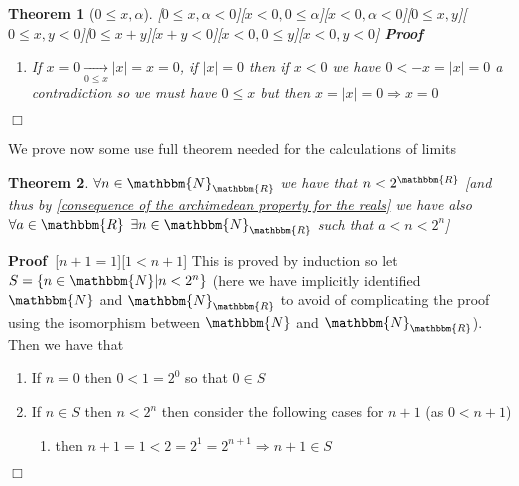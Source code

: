 \documentclass{book}
\newcommand{\Rightarrowlim}{\mathop{\rightarrow}\limits}
\newcommand{\equallim}{\mathop{=}\limits}
\newenvironment{proof}{\noindent\textbf{Proof\ }}{\hspace*{\fill}$\Box$\medskip}
\newtheorem{theorem}{Theorem}
\begin{document}
{{\begin{theorem}[$0 \leqslant x, \alpha$][$0 \leqslant x, \alpha < 0$][$x < 0,
0 \leqslant \alpha$][$x < 0, \alpha < 0$][$0 \leqslant x, y$][$0 \leqslant x,
y < 0$][$0 \leqslant x + y$][$x + y < 0$][$x < 0, 0 \leqslant y$][$x < 0, y <
0$]
\begin{proof}
\begin{enumerate}
\begin{enumerate}
\begin{enumerate}
          \item then $| x + y | = - x - y \Rightarrowlim_{0 \leqslant x
          \Rightarrow - x \leqslant 0 \leqslant x} - x - y \leqslant x - y
          \equallim_{- y = | y |} x + | y | = | x | + | y | \Rightarrow | x +
          y | \leqslant | x | + | y |$
        \end{enumerate}
        \item then if we take $x' = y$ and $y' = x$ we have $| x + y | = | y +
        x | = | x' + y' | \leqslant | x' | + | y' |$ (case (b)) and thus $| x
        + y | \leqslant | x | + | y |$
        
        \item then $x + y < 0 \Rightarrow | x + y | = - (x + y) = (- x) + (-
        y) = | x | + | y | \Rightarrow | x + y | \leqslant | x | + | y |$
      \end{enumerate}
      \item If $x = 0 \Rightarrowlim_{0 \leqslant x} | x | = x = 0$, if $| x |
      = 0$ then if $x < 0$ we have $0 < - x = | x | = 0$ a contradiction so we
      must have $0 \leqslant x$ but then $x = | x | = 0 \Rightarrow x = 0$
    \end{enumerate}
  \end{proof}
\end{theorem}

We prove now some use full theorem needed for the calculations of limits

\begin{theorem}
  \label{n<less>2^n}$\forall n \in \mathbbm{N}_{\mathbbm{R}}$ we have that $n
  < 2^{\mathbbm{R}}$ [and thus by \ref{consequence of the archimedean property
  for the reals} we have also $\forall a \in \mathbbm{R}$ $\exists n \in
  \mathbbm{N}_{\mathbbm{R}}$ such that $a < n < 2^n$]
\end{theorem}

\begin{proof}[$n + 1 = 1$][$1 < n + 1$]
  This is proved by induction so let $S = \{ n \in \mathbbm{N}|n < 2^n \}$
  (here we have implicitly identified $\mathbbm{N}$ and
  $\mathbbm{N}_{\mathbbm{R}}$ to avoid of complicating the proof using the
  isomorphism between $\mathbbm{N}$ and $\mathbbm{N}_{\mathbbm{R}}$). Then we
  have that
  \begin{enumerate}
    \item If $n = 0$ then $0 < 1 = 2^0$ so that $0 \in S$
    
    \item If $n \in S$ then $n < 2^n$ then consider the following cases for $n
    + 1$ (as $0 < n + 1$)
    \begin{enumerate}
      \item then $n + 1 = 1 < 2 = 2^1 = 2^{n + 1} \Rightarrow n + 1 \in S$
      

\end{enumerate}
\end{enumerate}
\end{proof}}}
\end{document}

